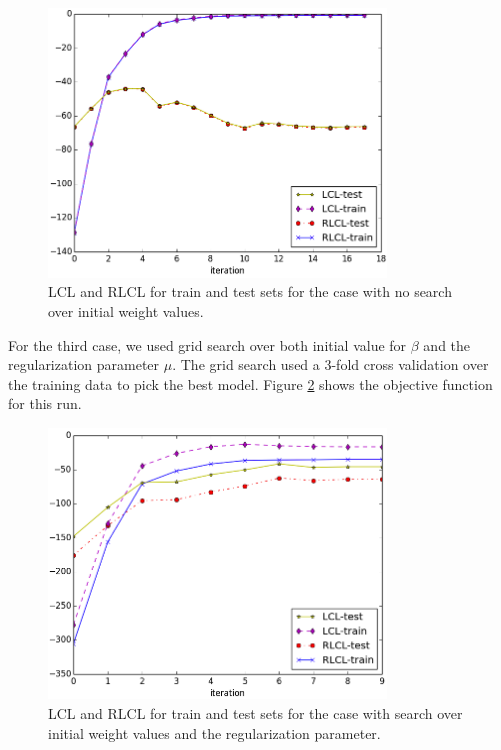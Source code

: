 \documentclass[twoside,12pt]{article}
\begin{document}
\begin{figure}[h!]
\label{figNoBeta0}
\centering
\includegraphics[width=0.8\textwidth]{nobeta0.png}
\caption{LCL and RLCL for train and test sets for the case with no search over initial weight values.}
\end{figure}

For the third case, we used grid search over both initial value for $\beta$ and the regularization parameter $\mu$. The grid search used a 3-fold cross validation over the training data to pick the best model. Figure \ref{figBFGSComplete} shows the objective function for this run.

\begin{figure}[h!]
\label{figBFGSComplete}
\centering
\includegraphics[width=0.8\textwidth]{bfgs.png}
\caption{LCL and RLCL for train and test sets for the case with search over initial weight values and the regularization parameter.}
\end{figure}
\end{document}

